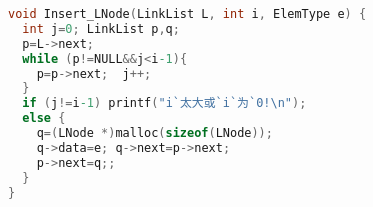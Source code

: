 \begin{lstlisting}[language=C]
void Insert_LNode(LinkList L, int i, ElemType e) {
  int j=0; LinkList p,q;  
  p=L->next;
  while (p!=NULL&&j<i-1){
    p=p->next;  j++;
  }
  if (j!=i-1) printf("i`太大或`i`为`0!\n");
  else {
    q=(LNode *)malloc(sizeof(LNode));
    q->data=e; q->next=p->next;
    p->next=q;;
  }
}
\end{lstlisting}

